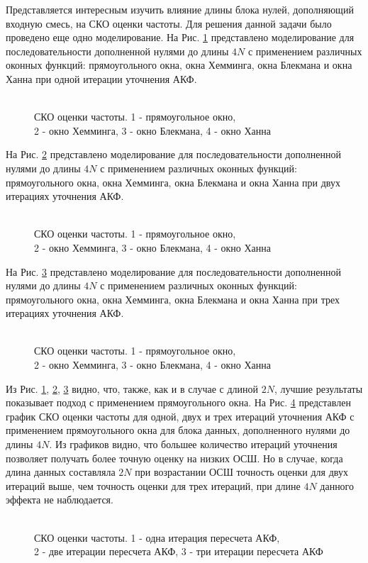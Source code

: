 Представляется интересным изучить влияние длины блока нулей, дополняющий входную смесь, на СКО оценки частоты. Для решения данной задачи было проведено еще одно моделирование.
На Рис. \ref{pic:fft4_1} представлено моделирование для последовательности дополненной нулями до длины ${4N}$ с применением различных оконных функций:
прямоугольного окна, окна Хемминга, окна Блекмана и окна Ханна при одной итерации уточнения АКФ.
\begin{figure}[h]
	\center{}
	\caption{\\СКО оценки частоты. 1 - прямоугольное окно,\\2 - окно Хемминга, 3 - окно Блекмана, 4 - окно Ханна}
	\label{pic:fft4_1}
\end{figure}

На Рис. \ref{pic:fft4_2} представлено моделирование для последовательности дополненной нулями до длины ${4N}$ с применением различных оконных функций:
прямоугольного окна, окна Хемминга, окна Блекмана и окна Ханна при двух итерациях уточнения АКФ.
\begin{figure}[h]
	\center{}
	\caption{\\СКО оценки частоты. 1 - прямоугольное окно,\\2 - окно Хемминга, 3 - окно Блекмана, 4 - окно Ханна}
	\label{pic:fft4_2}
\end{figure}

На Рис. \ref{pic:fft4_3} представлено моделирование для последовательности дополненной нулями до длины ${4N}$ с применением различных оконных функций:
прямоугольного окна, окна Хемминга, окна Блекмана и окна Ханна при трех итерациях уточнения АКФ.
\begin{figure}[h]
	\center{}
	\caption{\\СКО оценки частоты. 1 - прямоугольное окно,\\2 - окно Хемминга, 3 - окно Блекмана, 4 - окно Ханна}
	\label{pic:fft4_3}
\end{figure}

Из Рис. \ref{pic:fft4_1}, \ref{pic:fft4_2}, \ref{pic:fft4_3} видно, что, также, как и в случае с длиной ${2N}$, лучшие результаты показывает подход с применением прямоугольного окна.
На Рис. \ref{pic:fft4_rect_1_2_3}
представлен график СКО оценки частоты для одной, двух и трех итераций уточнения АКФ с применением прямоугольного окна для блока данных, дополненного нулями до длины ${4N}$.
Из графиков видно, что большее количество итераций уточнения позволяет получать более точную оценку на низких ОСШ. Но в случае, когда длина данных составляла ${2N}$
при возрастании ОСШ точность оценки для двух итераций выше, чем точность оценки для трех итераций, при длине ${4N}$ данного эффекта не наблюдается.
\begin{figure}[h]
	\center{}
	\caption{\\СКО оценки частоты. 1 - одна итерация пересчета АКФ,\\2 - две итерации пересчета АКФ, 3 - три итерации пересчета АКФ}
	\label{pic:fft4_rect_1_2_3}
\end{figure}

